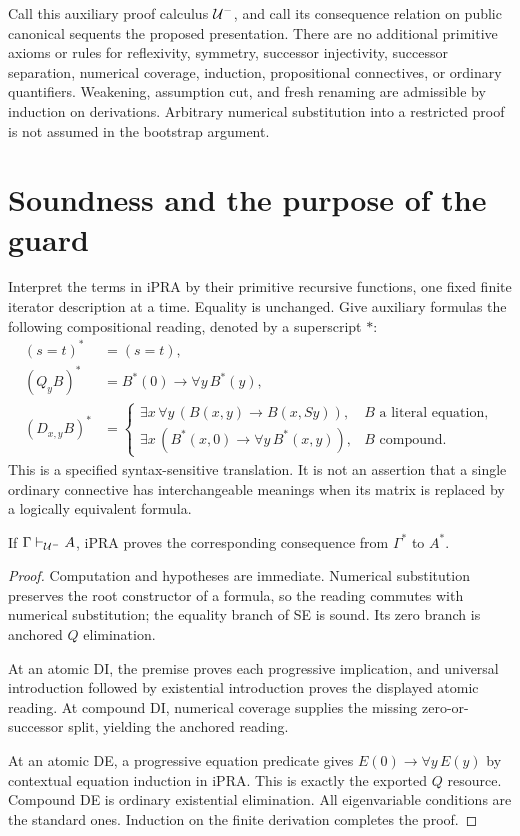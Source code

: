 Call this auxiliary proof calculus $\mathcal U^{-}$, and call its consequence relation
on public canonical sequents the proposed presentation. There are no
additional primitive axioms or rules for reflexivity, symmetry, successor
injectivity, successor separation, numerical coverage, induction,
propositional connectives, or ordinary quantifiers. Weakening, assumption
cut, and fresh renaming are admissible by induction on derivations. Arbitrary
numerical substitution into a restricted proof is not assumed in the
bootstrap argument.

\section{Soundness and the purpose of the guard}
\label{sec:sound}

Interpret the terms in iPRA by their primitive recursive functions, one fixed
finite iterator description at a time. Equality is unchanged. Give auxiliary
formulas the following compositional reading, denoted by a superscript $*$:
\begin{align*}
 (s=t)^*&=(s=t),\\
 (Q_yB)^*&=B^*(0)\to\forall y\,B^*(y),\\
 (D_{x,y}B)^*&=
 \begin{cases}
  \exists x\,\forall y\,(B(x,y)\to B(x,Sy)),&B\text{ a literal equation},\\
  \exists x\,(B^*(x,0)\to\forall y\,B^*(x,y)),&B\text{ compound}.
 \end{cases}
\end{align*}
This is a specified syntax-sensitive translation. It is not an assertion
that a single ordinary connective has interchangeable meanings when its
matrix is replaced by a logically equivalent formula.

\begin{lemma}
If $\Gamma\vdash_{\mathcal U^{-}}A$, iPRA proves the corresponding consequence
from $\Gamma^*$ to $A^*$.
\end{lemma}
\begin{proof}
Computation and hypotheses are immediate. Numerical substitution preserves
the root constructor of a formula, so the reading commutes with numerical
substitution; the equality branch of SE is sound. Its zero branch is
anchored $Q$ elimination.

At an atomic DI, the premise proves each progressive implication, and
universal introduction followed by existential introduction proves the
displayed atomic reading. At compound DI, numerical coverage supplies the
missing zero-or-successor split, yielding the anchored reading.

At an atomic DE, a progressive equation predicate gives
$E(0)\to\forall y\,E(y)$ by contextual equation induction in iPRA.
This is exactly the exported $Q$ resource. Compound DE is ordinary
existential elimination. All eigenvariable conditions are the standard
ones. Induction on the finite derivation completes the proof.
\end{proof}

